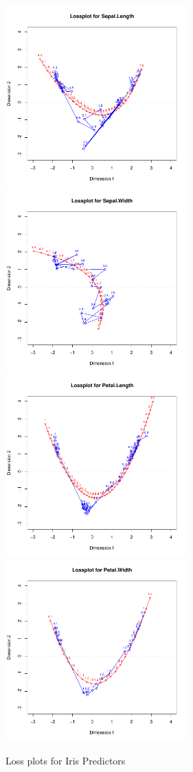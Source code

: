 \documentclass[article]{jss1}
\begin{document}
\begin{figure}[hbt]
\begin{center}
\includegraphics[height=70mm, width=70mm]{irisLoss1.pdf}
\includegraphics[height=70mm, width=70mm]{irisLoss2.pdf}
\includegraphics[height=70mm, width=70mm]{irisLoss3.pdf}
\includegraphics[height=70mm, width=70mm]{irisLoss4.pdf}
\caption{\label{fig:irisLoss}Loss plots for Iris Predictors}
\end{center}
\end{figure}
\end{document}
